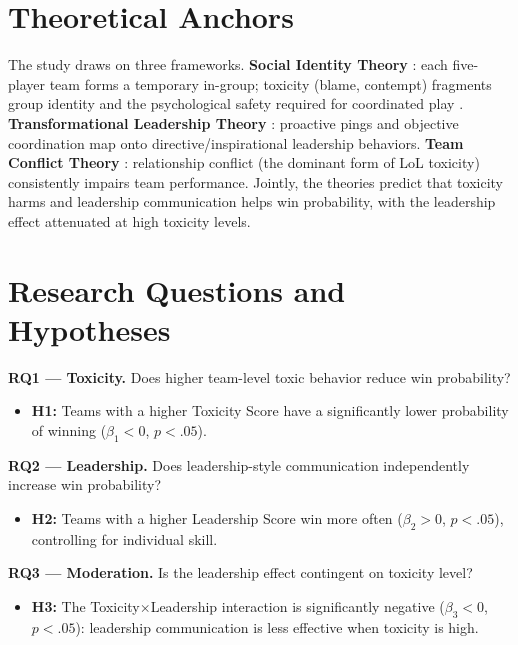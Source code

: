 \documentclass[11pt, a4paper]{article}
\begin{document}
\section{Theoretical Anchors}

The study draws on three frameworks.
\textbf{Social Identity Theory} \parencite{tajfel1979}: each five-player team forms a
temporary in-group; toxicity (blame, contempt) fragments group identity and the
psychological safety required for coordinated play \parencite{edmondson1999}.
\textbf{Transformational Leadership Theory} \parencite{bass1985}: proactive pings and
objective coordination map onto directive/inspirational leadership behaviors.
\textbf{Team Conflict Theory} \parencite{dedreu2003}: relationship conflict (the
dominant form of LoL toxicity) consistently impairs team performance.
Jointly, the theories predict that toxicity harms and leadership communication helps
win probability, with the leadership effect attenuated at high toxicity levels.

\section{Research Questions and Hypotheses}

\textbf{RQ1 — Toxicity.} Does higher team-level toxic behavior reduce win
probability?
\begin{itemize}
  \item \textbf{H1:} Teams with a higher Toxicity Score have a significantly lower
  probability of winning ($\beta_1 < 0$, $p<.05$).
\end{itemize}

\textbf{RQ2 — Leadership.} Does leadership-style communication independently
increase win probability?
\begin{itemize}
  \item \textbf{H2:} Teams with a higher Leadership Score win more often
  ($\beta_2 > 0$, $p<.05$), controlling for individual skill.
\end{itemize}

\textbf{RQ3 — Moderation.} Is the leadership effect contingent on toxicity level?
\begin{itemize}
  \item \textbf{H3:} The Toxicity$\times$Leadership interaction is significantly
  negative ($\beta_3 < 0$, $p<.05$): leadership communication is less effective
  when toxicity is high.
\end{itemize}
\end{document}
